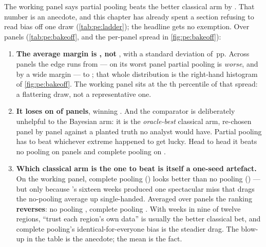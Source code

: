 


The working panel says partial pooling beats the better classical arm by \pc{\nbThreeGainOne}. That
number is an anecdote, and this chapter has already spent a section refusing to read bias off one
draw (\cref{tab:pe:ladder}); the headline gets no exemption. Over \nbThreeNseed{} panels
(\cref{tab:pe:bakeoff}, and the per-panel spread in \cref{fig:pe:bakeoff}):

\begin{enumerate}[leftmargin=*]
  \item \textbf{The average margin is \pc{\nbThreeGainMean}, not \pc{\nbThreeGainOne}}, with a
        standard deviation of \nbThreeGainSd\,pp. Across panels the edge runs from
        \pc{\nbThreeGainMin} --- on its worst panel partial pooling is \emph{worse}, and by a wide
        margin --- to \pc{\nbThreeGainMax}; that whole distribution is the right-hand histogram of
        \cref{fig:pe:bakeoff}. The working panel sits at the \nbThreePctileOne th
        percentile of that spread: a flattering draw, not a representative one.
  \item \textbf{It loses on \nbThreeNLosses{} of \nbThreeNseed{} panels}, winning
        \nbThreeNWins{}. And the comparator is deliberately unhelpful to the Bayesian arm: it is
        the \emph{oracle-best} classical arm, re-chosen panel by panel against a planted truth no
        analyst would have. Partial pooling has to beat whichever extreme happened to get lucky.
        Head to head it beats no pooling on \nbThreeWinsVsNopool{} panels and complete pooling on
        \nbThreeWinsVsComplete.
  \item \textbf{Which classical arm is the one to beat is itself a one-seed artefact.} On the
        working panel, complete pooling (\nbThreeMaeCompleteOne) looks better than no pooling
        (\nbThreeMaeNopoolOne) --- but only because \nbThreeWorstRegion's sixteen weeks produced one
        spectacular miss that drags the no-pooling average up single-handed. Averaged over panels
        the ranking \textbf{reverses}: no pooling \nbThreeMaeNopool, complete pooling
        \nbThreeMaeComplete. With \nbThreeObsMax{} weeks in nine of twelve regions, ``trust each
        region's own data'' is usually the better classical bet, and complete pooling's
        identical-for-everyone bias is the steadier drag. The blow-up in the table is the anecdote;
        the mean is the fact.
\end{enumerate}

